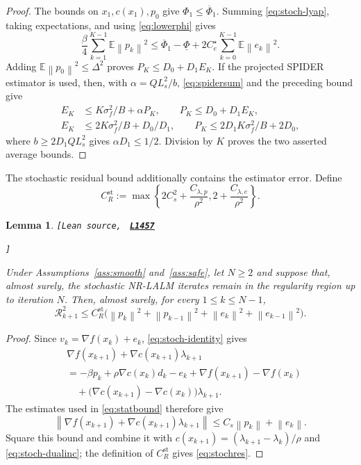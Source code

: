 \documentclass[11pt]{article}
\newtheorem{lemma}[theorem]{Lemma}
\theoremstyle{definition}
\theoremstyle{remark}
\numberwithin{equation}{section}
\numberwithin{figure}{section}
\numberwithin{table}{section}
\numberwithin{algorithm}{section}
\newcommand{\E}{\mathbb{E}}
\newcommand{\norm}[1]{\left\lVert #1\right\rVert}
\newcommand{\grad}{\nabla}
\newcommand{\leanLinkText}[1]{%
  \underline{\textbf{#1}}%
}
\newcommand{\leanDeclTag}[2]{%
  {\footnotesize\texttt{[Lean source, }}%
  \href{https://github.com/optpku/ReasBook/blob/v4.32.2/ReasBook/Papers/TR_LALM_theory/#1?plain=1\#L#2}%
    {\leanLinkText{\footnotesize\texttt{L#2}}}%
}
\newcommand{\leanDeclTagEnd}{%
  \unskip
  {\footnotesize\texttt{]}}\enspace
}
\begin{document}
\begin{proof}
The bounds on \(x_1,c(x_1),p_0\) give
\(\Phi_1\le\overline\Phi_1\).  Summing \eqref{eq:stoch-lyap}, taking
expectations, and using \eqref{eq:lowerphi} gives
$$
    \frac{\beta}{4}\sum_{k=1}^{K-1}\E\norm{p_k}^2
    \le \overline\Phi_1-\underline\Phi
       +2C_e^\star\sum_{k=0}^{K-1}\E\norm{e_k}^2.
$$
Adding \(\E\norm{p_0}^2\le\Delta^2\) proves
\(P_K\le D_0+D_1E_K\).  If the projected SPIDER estimator is used, then,
with \(\alpha=QL_s^2/b\), \eqref{eq:spidersum} and the preceding bound give
\begin{align*}
 E_K&\le K\sigma_f^2/B+\alpha P_K,\qquad
 P_K\le D_0+D_1E_K,\\
 E_K&\le2K\sigma_f^2/B+D_0/D_1,\qquad
 P_K\le2D_1K\sigma_f^2/B+2D_0,
\end{align*}
where \(b\ge2D_1QL_s^2\) gives \(\alpha D_1\le1/2\).
Division by \(K\) proves the two asserted average bounds.
\end{proof}

The stochastic residual bound additionally contains the estimator error.
Define
$$
    C_R^{\mathrm{st}}
    :=\max\left\{
       2C_s^2+\frac{C_{\lambda,p}}{\rho^2},
       2+\frac{C_{\lambda,e}}{\rho^2}
    \right\}.
$$

\begin{lemma}
\label{lem:stochres}
\leanDeclTag{Lemma_3_5.lean}{1457}
\leanDeclTagEnd
Under Assumptions~\ref{ass:smooth} and~\ref{ass:safe}, let $N\ge2$ and suppose that, almost surely, the stochastic NR-LALM iterates remain in the regularity region up to iteration $N$. Then, almost surely, for every
\(1\le k\le N-1\),
\begin{equation}
    \mathcal{R}_{k+1}^2
    \le C_R^{\mathrm{st}}\Big(
       \norm{p_k}^2+\norm{p_{k-1}}^2+\norm{e_k}^2+\norm{e_{k-1}}^2\Big).
    \label{eq:stochres}
\end{equation}
\end{lemma}

\begin{proof}
Since \(v_k=\grad f(x_k)+e_k\), \eqref{eq:stoch-identity} gives
\begin{align*}
&\grad f(x_{k+1})+\grad c(x_{k+1})\lambda_{k+1}\\
&=-\beta p_k+\rho\grad c(x_k)d_k-e_k
  +\grad f(x_{k+1})-\grad f(x_k)\\
&\quad+\big(\grad c(x_{k+1})-\grad c(x_k)\big)\lambda_{k+1}.
\end{align*}
The estimates used in \eqref{eq:statbound} therefore give
$$
    \norm{\grad f(x_{k+1})
       +\grad c(x_{k+1})\lambda_{k+1}}
    \le C_s\norm{p_k}+\norm{e_k}.
$$
Square this bound and combine it with
\(c(x_{k+1})=(\lambda_{k+1}-\lambda_k)/\rho\) and
\eqref{eq:stoch-dualinc}; the definition of \(C_R^{\mathrm{st}}\) gives
\eqref{eq:stochres}.
\end{proof}
\end{document}
